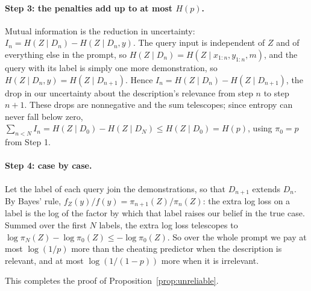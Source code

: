 \documentclass{article}
\begin{document}
\paragraph{Step 3: the penalties add up to at most $H(p)$.}
Mutual information is the reduction in uncertainty: $I_n = H(Z \mid D_n) - H(Z \mid D_n, y)$. The query input is independent of $Z$ and of everything else in the prompt, so $H(Z \mid D_n) = H(Z \mid x_{1:n}, y_{1:n}, m)$, and the query with its label is simply one more demonstration, so $H(Z \mid D_n, y) = H(Z \mid D_{n+1})$. Hence $I_n = H(Z \mid D_n) - H(Z \mid D_{n+1})$, the drop in our uncertainty about the description's relevance from step $n$ to step $n+1$. These drops are nonnegative and the sum telescopes; since entropy can never fall below zero, $\sum_{n < N} I_n = H(Z \mid D_0) - H(Z \mid D_N) \le H(Z \mid D_0) = H(p)$, using $\pi_0 = p$ from Step 1.

\paragraph{Step 4: case by case.}
Let the label of each query join the demonstrations, so that $D_{n+1}$ extends $D_n$. By Bayes' rule, $f_Z(y)/f(y) = \pi_{n+1}(Z)/\pi_n(Z)$: the extra log loss on a label is the log of the factor by which that label raises our belief in the true case. Summed over the first $N$ labels, the extra log loss telescopes to $\log \pi_N(Z) - \log \pi_0(Z) \le -\log \pi_0(Z)$. So over the whole prompt we pay at most $\log(1/p)$ more than the cheating predictor when the description is relevant, and at most $\log(1/(1-p))$ more when it is irrelevant.

This completes the proof of Proposition~\ref{prop:unreliable}.
\end{document}
